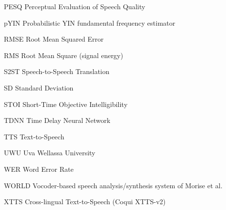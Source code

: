 {\begin{abbreviations}
\item[PESQ] Perceptual Evaluation of Speech Quality
\item[pYIN] Probabilistic YIN fundamental frequency estimator
\item[RMSE] Root Mean Squared Error
\item[RMS] Root Mean Square (signal energy)
\item[S2ST] Speech-to-Speech Translation
\item[SD] Standard Deviation
\item[STOI] Short-Time Objective Intelligibility
\item[TDNN] Time Delay Neural Network
\item[TTS] Text-to-Speech
\item[UWU] Uva Wellassa University
\item[WER] Word Error Rate
\item[WORLD] Vocoder-based speech analysis/synthesis system of Morise et al.
\item[XTTS] Cross-lingual Text-to-Speech (Coqui XTTS-v2)
\end{abbreviations}
\par}

